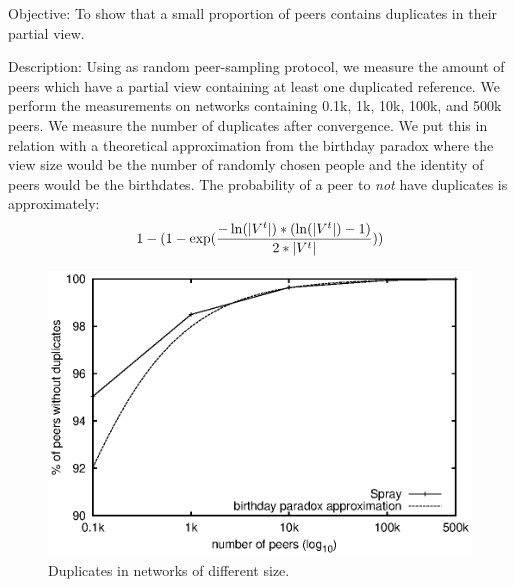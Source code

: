 \begin{asparadesc} 
\item[Objective:] To show that a small proportion of peers contains duplicates
  in their partial view.
\item[Description:] Using \SPRAY as random peer-sampling protocol, we measure
  the amount of peers which have a partial view containing at least one
  duplicated reference. We perform the measurements on networks containing 0.1k,
  1k, 10k, 100k, and 500k peers. We measure the number of duplicates after
  convergence. We put this in relation with a theoretical approximation from the
  birthday paradox where the view size would be the number of randomly chosen
  people and the identity of peers would be the birthdates. The probability of a
  peer to \emph{not} have duplicates is approximately:
  \begin{equation*}
    1- 
    (1-
    \exp({-\ln(|V^t|)*(\ln(|V^t|)-1)\over{2*|V^t|}}))
  \end{equation*}

\begin{figure}
  \centering
  \includegraphics[width=\SCALE\textwidth]{img/duplicates.eps}
  \caption{\label{fig:duplicates}Duplicates in networks of different size.}
\end{figure}



\end{asparadesc}
